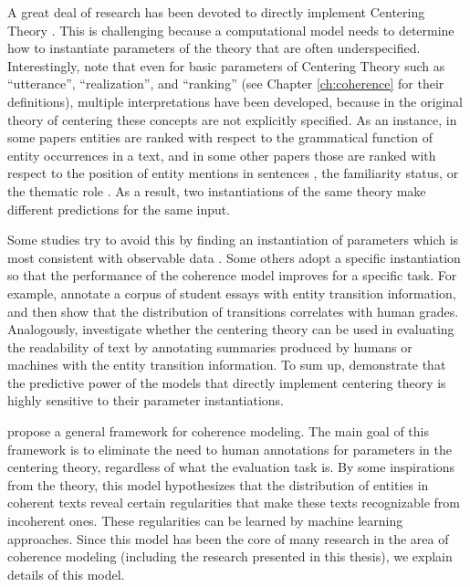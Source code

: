 A great deal of research has been devoted to directly implement Centering Theory \cite{miltsakaki00,karamanis04a}. 
This is challenging because a computational model needs to determine how to instantiate parameters of the theory that are often underspecified. 
Interestingly,  note that even for basic parameters of Centering Theory such as ``utterance'', ``realization'', and ``ranking'' (see Chapter \ref{ch:coherence} for their definitions), multiple interpretations have been developed, because in the original theory of centering these concepts are not explicitly specified. 
As an instance, in some papers entities are ranked with respect to the grammatical function \cite{brennan87,grosz95} of entity occurrences in a text, and in some other papers those are ranked with respect to the position of entity mentions in sentences \cite{prince81a}, the familiarity status, or the thematic role \cite{strube.cl99,moens08}.
As a result, two instantiations of the same theory make different predictions for the same input.  

Some studies try to avoid this by finding an instantiation of parameters which is most consistent with observable data \cite{strube.cl99,karamanis04a,poesio04b}. 
Some others adopt a specific instantiation so that the performance of the coherence model improves for a specific task. 
For example,  annotate a corpus of student essays with entity transition information, and then show that the distribution of transitions correlates with human grades. 
Analogously,  investigate whether the centering theory can be used in evaluating the readability of text by annotating summaries produced by humans or machines with the entity transition information. 
To sum up,  demonstrate that the predictive power of the models that directly implement centering theory is highly sensitive to their parameter instantiations.  

 propose a general framework for coherence modeling.  
The main goal of this framework is to eliminate the need to human annotations for parameters in the centering theory, regardless of what the evaluation task is. 
By some inspirations from the theory, this model hypothesizes that the distribution of entities in coherent texts reveal certain regularities that make these texts recognizable from incoherent ones. 
These regularities can be learned by machine learning approaches.  
Since this model has been the core of many research in the area of coherence modeling (including the research presented in this thesis), we explain details of this model.    

